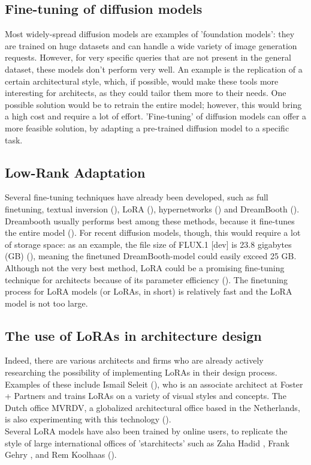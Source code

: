 \subsection{Fine-tuning of diffusion models}
Most widely-spread diffusion models are examples of 'foundation models': they are trained on huge datasets and can handle a wide variety of image generation requests. However, for very specific queries that are not present in the general dataset, these models don't perform very well. An example is the replication of a certain architectural style, which, if possible, would make these tools more interesting for architects, as they could tailor them more to their needs. One possible solution would be to retrain the entire model; however, this would bring a high cost and require a lot of effort. 'Fine-tuning' of diffusion models can offer a more feasible solution, by adapting a pre-trained diffusion model to a specific task. 
\subsection{Low-Rank Adaptation}
Several fine-tuning techniques have already been developed, such as full finetuning, textual inversion (\cite{gal_image_2022}), LoRA (\cite{hu_lora_2021}), hypernetworks (\cite{huang_continual_2021}) and DreamBooth (\cite{ruiz_dreambooth_2022}). Dreambooth usually performs best among these methods, because it fine-tunes the entire model (\cite{chen_generating_2023}). For recent diffusion models, though, this would require a lot of storage space: as an example, the file size of FLUX.1 [dev] is 23.8 gigabytes (GB) (\cite{noauthor_black-forest-labsflux1-dev_2025}), meaning the finetuned DreamBooth-model could easily exceed 25 GB. \\
Although not the very best method, LoRA could be a promising fine-tuning technique for architects because of its parameter efficiency (\cite{yang_low-rank_2024}). The finetuning process for LoRA models (or LoRAs, in short) is relatively fast and the LoRA model is not too large.

\subsection{The use of LoRAs in architecture design}
Indeed, there are various architects and firms who are already actively researching the possibility of  implementing LoRAs in their design process. Examples of these include Ismail Seleit (\cite{architech_network_ep_2024}), who is an associate architect at Foster + Partners and trains LoRAs on a variety of visual styles and concepts. The Dutch office MVRDV, a globalized architectural office based in the Netherlands, is also experimenting with this technology (\cite{show_it_better_how_2024}). \\
Several LoRA models have also been trained by online users, to replicate the style of large international offices of 'starchitects' such as Zaha Hadid \autocite{tangbohu_designed_2025}, Frank Gehry \autocite{laushine_frankgehryincuprum-lora_flux-architecture_2024}, and Rem Koolhaas (\cite{tangbohu_designed_2024}). 

